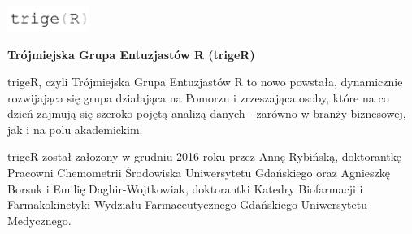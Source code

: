 \documentclass[\main/boa.tex]{subfiles}
\begin{document}
	
	\begin{minipage}[t]{0.915\textwidth}
		\center     
		\includegraphics[width=100px]{img/logos.bw/triger3.png} 
	\end{minipage}
	\begin{center}
	\Large \textbf {Trójmiejska Grupa Entuzjastów R (trigeR)}
	\end{center}
	
	\vskip 0.3cm
	\normalsize 


trigeR, czyli Trójmiejska Grupa Entuzjastów R to nowo powstała, dynamicznie rozwijająca się grupa działająca na Pomorzu i zrzeszająca osoby, które na co dzień zajmują się szeroko pojętą analizą danych - zarówno w branży biznesowej, jak i na polu akademickim.

trigeR został założony w grudniu 2016 roku przez Annę Rybińską, doktorantkę Pracowni Chemometrii Środowiska Uniwersytetu Gdańskiego oraz Agnieszkę Borsuk i Emilię Daghir-Wojtkowiak, doktorantki Katedry Biofarmacji i Farmakokinetyki Wydziału Farmaceutycznego Gdańskiego Uniwersytetu Medycznego.
	
	\vskip 1.5cm
\end{document}

